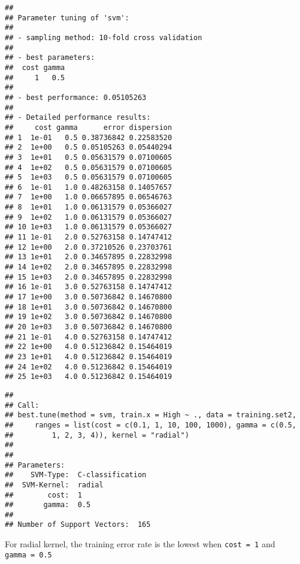 \documentclass[]{article}
\newenvironment{Shaded}{\begin{snugshade}}{\end{snugshade}}
\newcommand{\KeywordTok}[1]{\textcolor[rgb]{0.13,0.29,0.53}{\textbf{#1}}}
\newcommand{\DataTypeTok}[1]{\textcolor[rgb]{0.13,0.29,0.53}{#1}}
\newcommand{\DecValTok}[1]{\textcolor[rgb]{0.00,0.00,0.81}{#1}}
\newcommand{\FloatTok}[1]{\textcolor[rgb]{0.00,0.00,0.81}{#1}}
\newcommand{\StringTok}[1]{\textcolor[rgb]{0.31,0.60,0.02}{#1}}
\newcommand{\OperatorTok}[1]{\textcolor[rgb]{0.81,0.36,0.00}{\textbf{#1}}}
\newcommand{\NormalTok}[1]{#1}
\begin{document}
\begin{verbatim}
## 
## Parameter tuning of 'svm':
## 
## - sampling method: 10-fold cross validation 
## 
## - best parameters:
##  cost gamma
##     1   0.5
## 
## - best performance: 0.05105263 
## 
## - Detailed performance results:
##     cost gamma      error dispersion
## 1  1e-01   0.5 0.38736842 0.22583520
## 2  1e+00   0.5 0.05105263 0.05440294
## 3  1e+01   0.5 0.05631579 0.07100605
## 4  1e+02   0.5 0.05631579 0.07100605
## 5  1e+03   0.5 0.05631579 0.07100605
## 6  1e-01   1.0 0.48263158 0.14057657
## 7  1e+00   1.0 0.06657895 0.06546763
## 8  1e+01   1.0 0.06131579 0.05366027
## 9  1e+02   1.0 0.06131579 0.05366027
## 10 1e+03   1.0 0.06131579 0.05366027
## 11 1e-01   2.0 0.52763158 0.14747412
## 12 1e+00   2.0 0.37210526 0.23703761
## 13 1e+01   2.0 0.34657895 0.22832998
## 14 1e+02   2.0 0.34657895 0.22832998
## 15 1e+03   2.0 0.34657895 0.22832998
## 16 1e-01   3.0 0.52763158 0.14747412
## 17 1e+00   3.0 0.50736842 0.14670800
## 18 1e+01   3.0 0.50736842 0.14670800
## 19 1e+02   3.0 0.50736842 0.14670800
## 20 1e+03   3.0 0.50736842 0.14670800
## 21 1e-01   4.0 0.52763158 0.14747412
## 22 1e+00   4.0 0.51236842 0.15464019
## 23 1e+01   4.0 0.51236842 0.15464019
## 24 1e+02   4.0 0.51236842 0.15464019
## 25 1e+03   4.0 0.51236842 0.15464019
\end{verbatim}

\begin{Shaded}
\end{Shaded}

\begin{verbatim}
## 
## Call:
## best.tune(method = svm, train.x = High ~ ., data = training.set2, 
##     ranges = list(cost = c(0.1, 1, 10, 100, 1000), gamma = c(0.5, 
##         1, 2, 3, 4)), kernel = "radial")
## 
## 
## Parameters:
##    SVM-Type:  C-classification 
##  SVM-Kernel:  radial 
##        cost:  1 
##       gamma:  0.5 
## 
## Number of Support Vectors:  165
\end{verbatim}

For radial kernel, the training error rate is the lowest when
\texttt{cost\ =\ 1} and \texttt{gamma\ =\ 0.5}

\begin{Shaded}
\end{Shaded}
\end{document}
